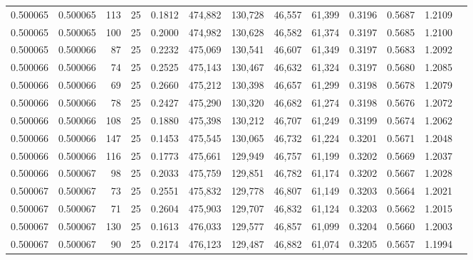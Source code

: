 \begin{tabular}{rrrrrrrrrrrrr}
0.500065 & 0.500065 &   113 &  25 &                                     0.1812 & 474,882 & 130,728 &  46,557 &  61,399 & 0.3196 & 0.5687 & 1.2109 \\
0.500065 & 0.500065 &   100 &  25 &                                     0.2000 & 474,982 & 130,628 &  46,582 &  61,374 & 0.3197 & 0.5685 & 1.2100 \\
0.500065 & 0.500066 &    87 &  25 &                                     0.2232 & 475,069 & 130,541 &  46,607 &  61,349 & 0.3197 & 0.5683 & 1.2092 \\
0.500066 & 0.500066 &    74 &  25 &                                     0.2525 & 475,143 & 130,467 &  46,632 &  61,324 & 0.3197 & 0.5680 & 1.2085 \\
0.500066 & 0.500066 &    69 &  25 &                                     0.2660 & 475,212 & 130,398 &  46,657 &  61,299 & 0.3198 & 0.5678 & 1.2079 \\
0.500066 & 0.500066 &    78 &  25 &                                     0.2427 & 475,290 & 130,320 &  46,682 &  61,274 & 0.3198 & 0.5676 & 1.2072 \\
0.500066 & 0.500066 &   108 &  25 &                                     0.1880 & 475,398 & 130,212 &  46,707 &  61,249 & 0.3199 & 0.5674 & 1.2062 \\
0.500066 & 0.500066 &   147 &  25 &                                     0.1453 & 475,545 & 130,065 &  46,732 &  61,224 & 0.3201 & 0.5671 & 1.2048 \\
0.500066 & 0.500066 &   116 &  25 &                                     0.1773 & 475,661 & 129,949 &  46,757 &  61,199 & 0.3202 & 0.5669 & 1.2037 \\
0.500066 & 0.500067 &    98 &  25 &                                     0.2033 & 475,759 & 129,851 &  46,782 &  61,174 & 0.3202 & 0.5667 & 1.2028 \\
0.500067 & 0.500067 &    73 &  25 &                                     0.2551 & 475,832 & 129,778 &  46,807 &  61,149 & 0.3203 & 0.5664 & 1.2021 \\
0.500067 & 0.500067 &    71 &  25 &                                     0.2604 & 475,903 & 129,707 &  46,832 &  61,124 & 0.3203 & 0.5662 & 1.2015 \\
0.500067 & 0.500067 &   130 &  25 &                                     0.1613 & 476,033 & 129,577 &  46,857 &  61,099 & 0.3204 & 0.5660 & 1.2003 \\
0.500067 & 0.500067 &    90 &  25 &                                     0.2174 & 476,123 & 129,487 &  46,882 &  61,074 & 0.3205 & 0.5657 & 1.1994 \\

\end{tabular}
